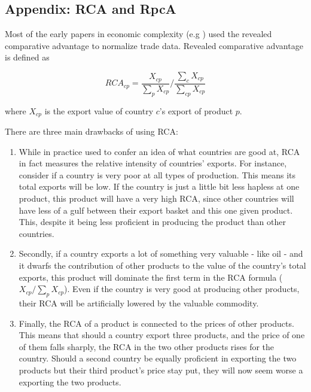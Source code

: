 \documentclass[11pt]{article}
\begin{document}
\begin{appendices}









\newpage 

\section{Appendix: RCA and RpcA}%
\label{sec:rca}
Most of the early papers in economic complexity (e.g \citealp{tacchella_new_2012,hidalgo_building_2009}) used the revealed comparative advantage \citep{balassa_trade_1965} to normalize trade data. Revealed comparative advantage is defined as

\[
	RCA_{cp} = \frac{X_{cp}}{\sum_p X_{cp}} \bigg / \frac{\sum_c X_{cp}}{\sum_{cp} X_{cp}}
\]

where $X_{cp}$ is the export value of country $c$'s export of product $p$.

There are three main drawbacks of using RCA:

\begin{enumerate}
\item While in practice used to confer an idea of what countries are good at, RCA in fact measures the relative intensity of countries' exports. For instance, consider if a country is very poor at all types of production. This means its total exports will be low. If the country is just a little bit less hapless at one product, this product will have a very high RCA, since other countries will have less of a gulf between their export basket and this one given product. This, despite it being less proficient in producing the product than other countries.
\item Secondly, if a country exports a lot of something very valuable - like oil - and it dwarfs the contribution of other products to the value of the country's total exports, this product will dominate the first term in the RCA formula ($X_{cp} / \sum_p X_{cp}$). Even if the country is very good at producing other products, their RCA will be artificially lowered by the valuable commodity.
\item Finally, the RCA of a product is connected to the prices of other products. This means that should a country export three products, and the price of one of them falls sharply, the RCA in the two other products rises for the country. Should a second country be equally proficient in exporting the two products but their third product's price stay put, they will now seem worse a exporting the two products.
\end{enumerate}


\end{appendices}
\end{document}
